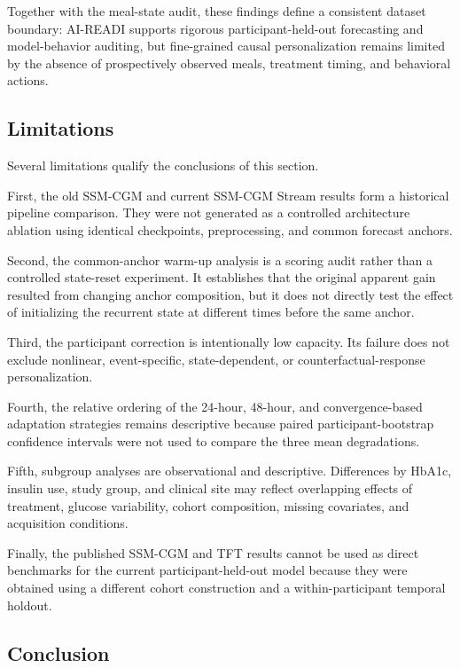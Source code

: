 Together with the meal-state audit, these findings define a consistent dataset
boundary: AI-READI supports rigorous participant-held-out forecasting and
model-behavior auditing, but fine-grained causal personalization remains limited
by the absence of prospectively observed meals, treatment timing, and behavioral
actions.

\subsection{Limitations}
\label{subsec:forecasting_personalization_limitations}

Several limitations qualify the conclusions of this section.

First, the old SSM-CGM and current SSM-CGM Stream results form a historical
pipeline comparison. They were not generated as a controlled architecture
ablation using identical checkpoints, preprocessing, and common forecast
anchors.

Second, the common-anchor warm-up analysis is a scoring audit rather than a
controlled state-reset experiment. It establishes that the original apparent
gain resulted from changing anchor composition, but it does not directly test
the effect of initializing the recurrent state at different times before the
same anchor.

Third, the participant correction is intentionally low capacity. Its failure
does not exclude nonlinear, event-specific, state-dependent, or
counterfactual-response personalization.

Fourth, the relative ordering of the 24-hour, 48-hour, and convergence-based
adaptation strategies remains descriptive because paired participant-bootstrap
confidence intervals were not used to compare the three mean degradations.

Fifth, subgroup analyses are observational and descriptive. Differences by
HbA1c, insulin use, study group, and clinical site may reflect overlapping
effects of treatment, glucose variability, cohort composition, missing
covariates, and acquisition conditions.

Finally, the published SSM-CGM and TFT results cannot be used as direct
benchmarks for the current participant-held-out model because they were
obtained using a different cohort construction and a within-participant temporal
holdout.

\subsection{Conclusion}
\label{subsec:forecasting_personalization_conclusion}

